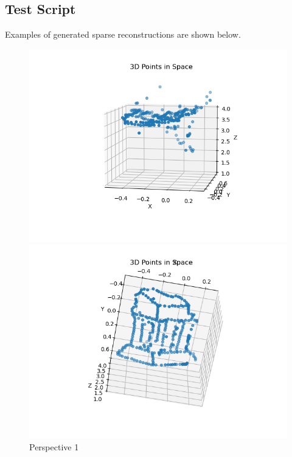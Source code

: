 \newpage
\subsection{Test Script}

\step
Examples of generated sparse reconstructions are shown below.

\begin{figure}[H]
  \centering
  \begin{minipage}{.49\textwidth}
    \centering
    \includegraphics[width=\textwidth]{./figures/sparse-1.png}
    \caption*{Perspective 1}
  \end{minipage}
  \hfill
  \begin{minipage}{.49\textwidth}
    \centering
    \includegraphics[width=\textwidth]{./figures/sparse-2.png}

\end{minipage}
\end{figure}

